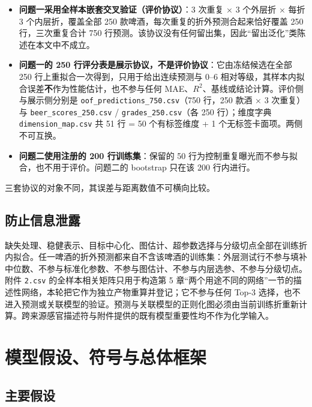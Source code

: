 \documentclass[11pt,a4paper]{article}
\providecommand{\tightlist}{%
  \setlength{\itemsep}{0pt}\setlength{\parskip}{0pt}}
\begin{document}
\begin{itemize}
\tightlist
\item
  \textbf{问题一采用全样本嵌套交叉验证（评价协议）}：3 次重复 × 3
  个外层折 × 每折 3 个内层折，覆盖全部 250
  款啤酒，每次重复的折外预测合起来恰好覆盖 250 行，三次重复合计 750
  行预测。该协议没有任何留出集，因此``留出泛化''类陈述在本文中不成立。
\item
  \textbf{问题一的 250
  行评分表是展示协议，不是评价协议}：它由冻结候选在全部 250
  行上重拟合一次得到，只用于给出连续预测与 0--6
  相对等级，其样本内拟合误差\textbf{不}作为性能估计，也不参与任何
  MAE、\(R^2\)、基线或结论计算。评价侧与展示侧分别是
  \texttt{oof\_predictions\_750.csv}（750 行，250 款酒 × 3 次重复）与
  \texttt{beer\_scores\_250.csv} / \texttt{grades\_250.csv}（各 250
  行）；维度字典 \texttt{dimension\_map.csv} 共 51 行 = 50 个有标签维度
  + 1 个无标签卡面项。两侧不可互换。
\item
  \textbf{问题二使用注册的 200 行训练集}：保留的 50
  行为控制重复曝光而不参与拟合，也不用于评价。问题二的 bootstrap 只在该
  200 行内进行。
\end{itemize}

三套协议的对象不同，其误差与距离数值不可横向比较。

\subsection{防止信息泄露}\label{ux9632ux6b62ux4fe1ux606fux6cc4ux9732}

缺失处理、稳健表示、目标中心化、图估计、超参数选择与分级切点全部在训练折内拟合。任一啤酒的折外预测都来自不含该啤酒的训练集：外层测试行不参与填补中位数、不参与标准化参数、不参与图估计、不参与内层选参、不参与分级切点。附件
\texttt{2.csv} 的全样本相关矩阵只用于构造第 5
章``两个用途不同的网络''一节的描述性网络，本轮把它作为独立产物重算并登记；它不参与任何
Top-3
选择，也不进入预测或关联模型的验证。预测与关联模型的正则化图必须由当前训练折重新计算。跨来源感官描述符与附件提供的既有模型重要性均不作为化学输入。

\section{模型假设、符号与总体框架}\label{ux6a21ux578bux5047ux8bbeux7b26ux53f7ux4e0eux603bux4f53ux6846ux67b6}

\subsection{主要假设}\label{ux4e3bux8981ux5047ux8bbe}
\end{document}
